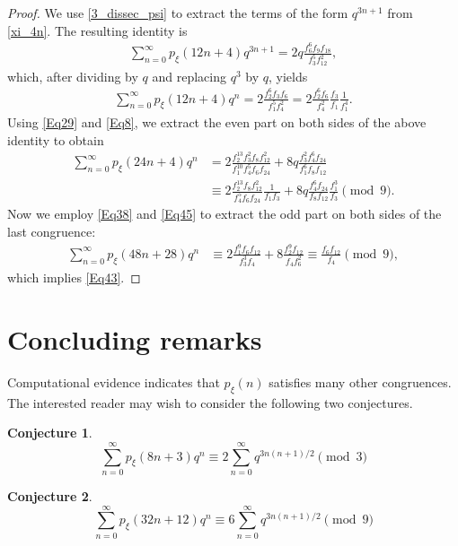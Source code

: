 \documentclass[12pt]{article}
\newtheorem{conjecture}{Conjecture}[section]
\begin{document}
\begin{proof}
We use \eqref{3_dissec_psi} to extract the terms of the form $q^{3n+1}$ from \eqref{xi_4n}. The resulting identity is
\begin{align*}
\sum_{n=0}^{\infty} p_{\xi}(12n+4)q^{3n+1} = 2q\frac{f_{6}^6f_9f_{18}}{f_3^5f_{12}^2},
\end{align*}
which, after dividing by $q$ and replacing $q^3$ by $q$, yields
\begin{align*}
\sum_{n=0}^{\infty} p_{\xi}(12n+4)q^{n} = 2\frac{f_{2}^6f_3f_{6}}{f_1^5f_{4}^2} = 2\frac{f_{2}^6f_{6}}{f_{4}^2} \frac{f_3}{f_1} \frac{1}{f_1^4}.
\end{align*}
Using \eqref{Eq29} and \eqref{Eq8}, we extract the even part on both sides of the above identity to obtain 
\begin{align*}
\sum_{n=0}^{\infty} p_{\xi}(24n+4)q^{n} & = 2\frac{f_{2}^{13}f_3^2f_{8}f_{12}^2}{f_1^{10}f_{4}^5f_6f_{24}} + 8q\frac{f_{3}^2f_{4}^6f_{24}}{f_1^6f_8f_{12}}  \\
& \equiv 2\frac{f_{2}^{13}f_{8}f_{12}^2}{f_{4}^5f_6f_{24}}\frac{1}{f_1f_3} + 8q\frac{f_{4}^6f_{24}}{f_8f_{12}} \frac{f_1^3}{f_3} \pmod{9}.
\end{align*}
Now we employ \eqref{Eq38} and \eqref{Eq45} to extract the odd part on both sides of the last congruence:
\begin{align*}
\sum_{n=0}^{\infty} p_{\xi}(48n+28)q^{n} & \equiv 2\frac{f_{1}^{9}f_6f_{12}}{f_{3}^3f_4} + 8\frac{f_{2}^9f_{12}}{f_4f_{6}^2} \equiv \frac{f_6f_{12}}{f_4} \pmod{9},
\end{align*}
which implies \eqref{Eq43}.
\end{proof}
		
		
		
\section{Concluding remarks}

Computational evidence indicates that $p_{\xi}(n)$ satisfies many other congruences.  The interested reader may wish to consider the following two conjectures.  

\begin{conjecture}
\label{Conj1}
$$\sum_{n=0}^\infty p_{\xi}(8n+3)q^n \equiv 2\sum_{n=0}^\infty q^{3n(n+1)/2} \pmod{3}$$
\end{conjecture}

\begin{conjecture}
\label{Conj2}
$$\sum_{n=0}^\infty p_{\xi}(32n+12)q^n \equiv 6\sum_{n=0}^\infty q^{3n(n+1)/2} \pmod{9}$$
\end{conjecture}
\end{document}
